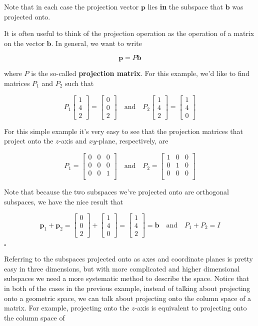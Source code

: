 \documentclass[12pt]{article}
\newcommand{\nin}{\noindent}
\newcommand{\vthree}{\vspace{3mm}}
\newcommand{\mymat}[1]{
\left[
\begin{array}{rrrrrrrrrrrrrrrrrrrrrrrrrrrrrrrrrrrrrrr}
#1
\end{array}
\right]
}
\newcommand{\bp}{\mathbf{p}}
\newcommand{\bfb}{\mathbf{b}}
\begin{document}
\vthree

\nin Note that in each case the projection vector $\bp$ lies {\bf in} the subspace that $\bfb$ was projected onto.

\vthree

\nin It is often useful to think of the projection operation as the operation of a matrix on the vector $\bfb$.  In general, we want to write

\[
\bp = P \bfb
\]

\vthree

\nin where $P$ is the so-called {\bf projection matrix}.  For this example, we'd like to find matrices $P_1$ and $P_2$ such that

\[
P_1 \mymat{1 \\ 4 \\ 2} = \mymat{0 \\ 0 \\ 2} \quad \textrm{and} \quad
P_2 \mymat{1 \\ 4 \\ 2} = \mymat{1 \\ 4 \\ 0}
\]

\vthree

\nin For this simple example it's very easy to see that the projection matrices that project onto the $z$-axis and $xy$-plane, respectively, are

\[
P_1 =
\mymat{
0 & 0 & 0 \\
0 & 0 & 0 \\
0 & 0 & 1 \\
}
\quad \textrm{and} \quad
P_2 =
\mymat{
1 & 0 & 0 \\
0 & 1 & 0 \\
0 & 0 & 0 \\
}
\]

\vthree

\nin Note that because the two subspaces we've projected onto are orthogonal subspaces, we have the nice result that

\[
\bp_1 + \bp_2 = \mymat{0 \\ 0 \\ 2} + \mymat{1 \\ 4 \\ 0} = \mymat{1 \\ 4 \\ 2} = \bfb
\quad \textrm{and} \quad
P_1 + P_2 = I
\]

\hfill $\square$

\vthree

\nin Referring to the subspaces projected onto as axes and coordinate planes is pretty easy in three dimensions, but with more complicated and higher dimensional subspaces we need a more systematic method to describe the space.  Notice that in both of the cases in the previous example, instead of talking about projecting onto a geometric space, we can talk about projecting onto the column space of a matrix.  For example, projecting onto the $z$-axis is equivalent to projecting onto the column space of
\end{document}
